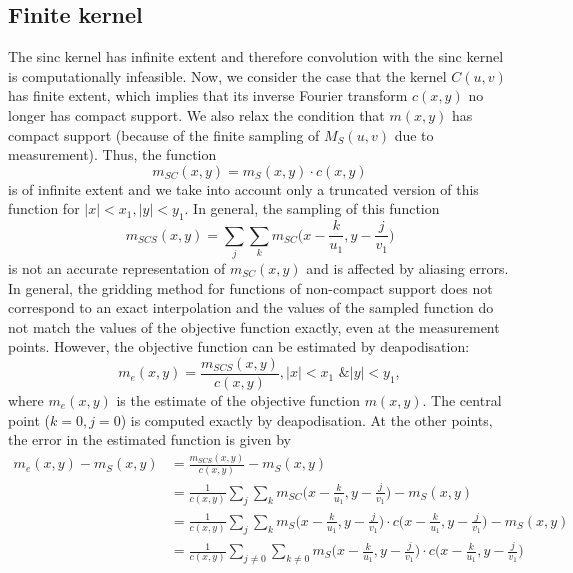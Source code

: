 \documentclass[11pt]{article}
\begin{document}
\subsection{Finite kernel}
The sinc kernel has infinite extent and therefore convolution with the sinc kernel is computationally infeasible. Now, we consider the case that the kernel $C(u,v)$ has finite extent, which implies that its inverse Fourier transform $c(x,y)$ no longer has compact support. We also relax the condition that $m(x,y)$ has compact support (because of the finite sampling of $M_S(u,v)$ due to measurement). Thus, the function
\begin{equation}
m_{SC}(x,y) = m_S(x,y) \cdot c(x,y)
\end{equation}
is of infinite extent and we take into account only a truncated version of this function for $|x|<x_1, |y|<y_1$. In general, the sampling of this function
\begin{equation}
m_{SCS}(x,y) = \sum_j \sum_k m_{SC}\Bigg(x - \frac{k}{u_1}, y - \frac{j}{v_1} \Bigg)
\end{equation}
is not an accurate representation of $m_{SC}(x,y)$ and is affected by aliasing errors. In general, the gridding method for functions of non-compact support does not correspond to an exact interpolation and the values of the sampled function do not match the values of the objective function exactly, even at the measurement points. However, the objective function can be estimated by deapodisation:
\begin{equation}
m_e(x,y) = \frac{m_{SCS}(x,y)}{c(x,y)}, |x|<x_1 \text{ \& } |y|<y_1,
\end{equation}
where $m_e(x,y)$ is the estimate of the objective function $m(x,y)$. The central point ($k=0, j=0$) is computed exactly by deapodisation. At the other points, the error in the estimated function is given by
\begin{align}
m_e(x,y) - m_{S}(x,y) &= \frac{m_{SCS}(x,y)}{c(x,y)} - m_{S}(x,y) \\
&= \frac{1}{c(x,y)}\sum_j \sum_k m_{SC}\Bigg(x - \frac{k}{u_1}, y - \frac{j}{v_1} \Bigg) - m_S(x,y)\\
&= \frac{1}{c(x,y)}\sum_j \sum_k m_{S}\Bigg(x - \frac{k}{u_1}, y - \frac{j}{v_1} \Bigg) \cdot c\Bigg( x - \frac{k}{u_1}, y - \frac{j}{v_1}\Bigg) - m_S(x,y) \\
&= \frac{1}{c(x,y)}\sum_{j\neq0} \sum_{k\neq0} m_{S}\Bigg(x - \frac{k}{u_1}, y - \frac{j}{v_1} \Bigg) \cdot c\Bigg( x - \frac{k}{u_1}, y - \frac{j}{v_1}\Bigg)
\end{align}
\end{document}
